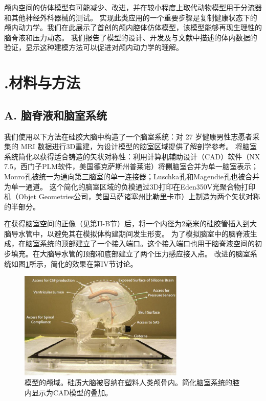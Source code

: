 \documentclass[12pt]{article}
\begin{document}
颅内空间的仿体模型有可能减少、改进，并在较小程度上取代动物模型用于分流器和其他神经外科器械的测试。
实现此类应用的一个重要步骤是复制健康状态下的颅内动力学。我们在此展示了首创的颅内腔体仿体模型，该模型能够再现生理性的脑脊液和压力动态。
我们报告了模型的设计、开发及与文献中描述的体内数据的验证，显示这种建模方法可以促进对颅内动力学的理解。

\section*{\uppercase\expandafter{}.材料与方法}

\subsection*{A. 脑脊液和脑室系统}
我们使用以下方法在硅胶大脑中构造了一个脑室系统：对 27 岁健康男性志愿者采集的 MRI 数据进行3D重建，为设计模型的脑室区域提供了解剖学参考。
将脑室系统简化以获得适合铸造的矢状对称性：利用计算机辅助设计（CAD）软件（NX 7.5，西门子PLM软件，美国德克萨斯州普莱诺）将侧脑室合并为单一脑室表示；Monro孔被统一为通向第三脑室的单一连接器；Luschka孔和Magendie孔也被合并为单一通道。
这个简化的脑室区域的负模通过3D打印在Eden350V光聚合物打印机（Objet Geometries公司，美国马萨诸塞州比勒里卡市）上制造为两个矢状对称的半部分。

在获得脑室空间的正像（见第II-B节）后，将一个内径为2毫米的硅胶管插入到大脑导水管中，以避免其在模拟体构建期间发生形变。
为了模拟脑室中的脑脊液生成，在脑室系统的顶部建立了一个接入端口。这个接入端口也用于脑脊液空间的初步填充。在大脑导水管的顶部和底部建立了两个压力感应接入点。
改进的脑室系统如图\ref{fig:ventricular_system}所示，简化的效果在第IV节讨论。
\begin{figure}[h]
    \centering
    \includegraphics[width=0.7\textwidth]{Figures/1.png}
    \caption{模型的颅域。硅质大脑被容纳在塑料人类颅骨内。简化脑室系统的腔内显示为CAD模型的叠加。}
    \label{fig:ventricular_system}
\end{figure}
\end{document}

